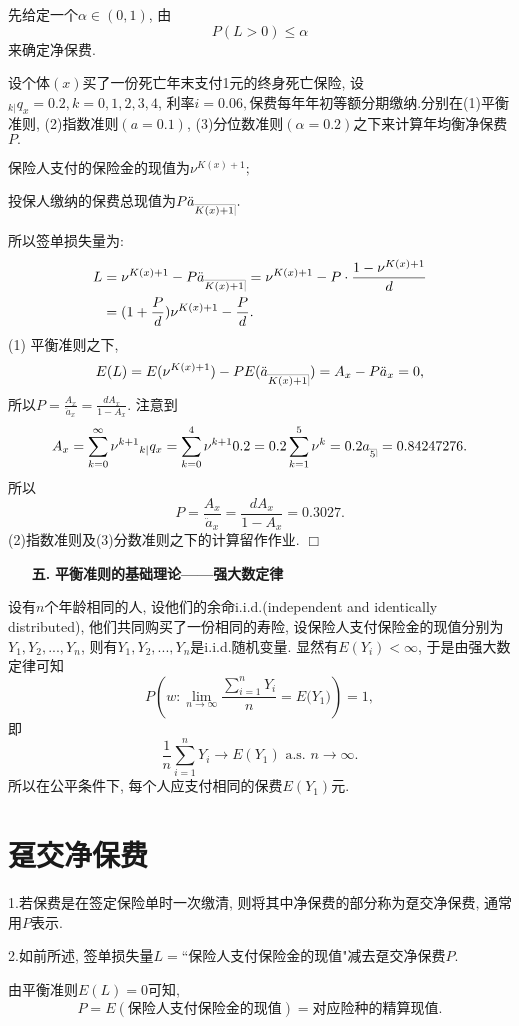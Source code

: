 \documentclass[a4paper,openany, 10pt]{ctexbook}
\makeatletter
\newcommand{\hei}{\CJKfamily{hei}}      %
\def\qed{\hfill$\Box$\medskip}
\def\z{\left}
\def\y{\right}
\DeclareRobustCommand{\annu}[1]{_{%
    \def\arraystretch{0}%
    \setlength\arraycolsep{1pt}%
    \setlength\arrayrulewidth{.2pt}%
    \begin{array}[b]{@{}c|}\hline
        \\[\arraycolsep]%
        \scriptstyle #1%
    \end{array}%
}}
\makeatother
\begin{document}
先给定一个$\alpha\in (0,1)$, 由$$P(L>0)\leqslant\alpha$$来确定净保费.
\begin{example}\label{e4.1}
   设个体$(x)$买了一份死亡年末支付1元的终身死亡保险, 设$_{k| }q_x=0.2,k=0,1,2,3,4$, 利率$i=0.06,$保费每年年初等额分期缴纳.分别在(1)平衡准则, (2)指数准则$(a=0.1)$, (3)分位数准则$(\alpha=0.2)$之下来计算年均衡净保费$P.$
\end{example}
\solution 保险人支付的保险金的现值为$\nu^{K(x)+1};$

投保人缴纳的保费总现值为$P\ddot a_{\annu {K(x)+1}}.$

所以签单损失量为:
\begin{align*}
    L & =\nu^{K(x)+1}-P\ddot a_{\annu {K(x)+1}}=\nu^{K(x)+1}-P\cdot\frac{1-\nu^{K(x)+1}}{d} \\
        & =(1+\frac{P}{d})\nu^{K(x)+1}-\frac{P}{d}. \\
\end{align*}
(1) 平衡准则之下,
$$E(L)=E(\nu^{K(x)+1})-PE(\ddot a_{\annu {K(x)+1}})=A_x-P\ddot a_{x}=0,$$
所以$P=\frac{A_x}{\ddot a_{x}}=\frac{dA_x}{1-A_x}.$
注意到$$
    A_x  =\sum_{k=0}^{\infty }{\nu^{k+1}{}_{k|}q_x}=\sum_{k=0}^4{\nu^{k+1}0.2}=0.2\sum_{k=1}^{5}{\nu^k}=0.2a_{\annu 5}=0.84247276.
$$
所以$$P=\frac{A_x}{\ddot a_{x}}=\frac{dA_x}{1-A_x}=0.3027.$$
(2)指数准则及(3)分数准则之下的计算留作作业. \qed

\begin{itemize}
    \item[{\bf\hei 五.}]{\bf\hei 平衡准则的基础理论——强大数定律}
\end{itemize}

设有$n$个年龄相同的人, 设他们的余命i.i.d.(independent and identically distributed), 他们共同购买了一份相同的寿险, 设保险人支付保险金的现值分别为$Y_1,Y_2,...,Y_n$, 则有$Y_1,Y_2,...,Y_n$是i.i.d.随机变量. 显然有$E(Y_i)<\infty$, 于是由强大数定律可知
$$P\z({w:\underset{n\rightarrow \infty}{\lim}\frac{\sum_{i=1}^{n}{Y_i}}{n}=E(Y_1})\y)=1,$$ 即
$$\frac{1}{n}\sum_{i=1}^n{Y_i}\rightarrow E(Y_1)\text{ a.s. }n\rightarrow\infty.$$
所以在公平条件下, 每个人应支付相同的保费$E(Y_1)$元.
\section{趸交净保费}
1.若保费是在签定保险单时一次缴清, 则将其中净保费的部分称为趸交净保费, 通常用$P$表示.

2.如前所述, 签单损失量$L=$``保险人支付保险金的现值"减去趸交净保费$P.$

由平衡准则$E(L)=0$可知, $$P=E(\text{保险人支付保险金的现值})=\text{对应险种的精算现值}.$$
\end{document}
